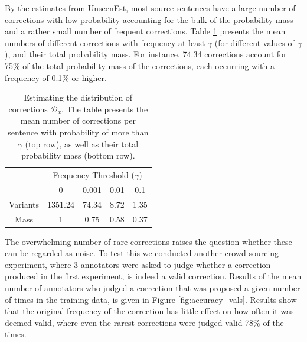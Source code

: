 \documentclass[letterpaper, 11pt]{article}
\begin{document}
By the estimates from {\sc UnseenEst}, most source sentences have a large number of
corrections with low probability accounting for the bulk of the probability mass
and a rather small number of frequent corrections.
Table \ref{tab:corrections_dist} presents the mean numbers of different corrections with frequency at least
$\gamma$ (for different values of $\gamma$), and their total probability mass.
For instance, 74.34 corrections account for 75\% of the total probability mass of the corrections, each
occurring with a frequency of 0.1\% or higher.

\begin{table}[h!]
	\vspace{-0.5cm}
  \centering
  \small
  \singlespacing
  \begin{tabular}{c|c|c|c|c|}
    & \multicolumn{4}{c|}{Frequency Threshold ($\gamma$)}\\ 
    & \multicolumn{1}{c}{0} & \multicolumn{1}{c}{0.001} & \multicolumn{1}{c}{0.01} & \multicolumn{1}{c|}{0.1}
    \\
    \hline
    Variants & 1351.24 & 74.34 & 8.72 & 1.35
    \\
    Mass & 1 & 0.75 & 0.58 & 0.37\\
    \hline
  \end{tabular}
  \caption{\label{tab:corrections_dist}
    Estimating the distribution of corrections $\mathcal{D}_x$.
    The table presents the mean number of corrections per sentence with probability of more than
    $\gamma$ (top row), as well as their total probability mass (bottom row).
  }
  \vspace{-0.3cm}
\end{table}

The overwhelming number of rare corrections raises the question whether these can be regarded as noise.
To test this we conducted another crowd-sourcing experiment, where 3 annotators were asked to
judge whether a correction produced in the first experiment, is indeed a valid correction. Results of the
mean number of annotators who judged a correction that was proposed a given number of times in the
training data, is given in Figure \ref{fig:accuracy_vals}. 
Results show that the original frequency of the correction has little effect on how often it was deemed
valid, where even the rarest corrections were judged valid 78\% of the times.
\end{document}
